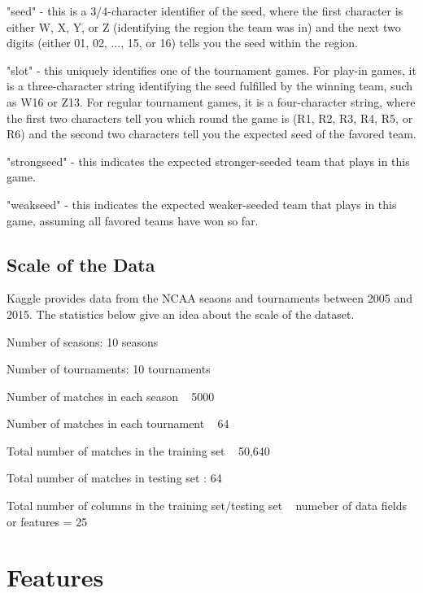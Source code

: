 \documentclass{article}
\begin{document}
\begin{multicols}{2}
\begin{list}{Field}{}
"seed" - this is a 3/4-character identifier of the seed, where the first character is either W, X, Y, or Z (identifying the region the team was in) and the next two digits (either 01, 02, ..., 15, or 16) tells you the seed within the region.
\item
"slot" - this uniquely identifies one of the tournament games. For play-in games, it is a three-character string identifying the seed fulfilled by the winning team, such as W16 or Z13. For regular tournament games, it is a four-character string, where the first two characters tell you which round the game is (R1, R2, R3, R4, R5, or R6) and the second two characters tell you the expected seed of the favored team.
\item
"strongseed" - this indicates the expected stronger-seeded team that plays in this game.
\item
"weakseed" - this indicates the expected weaker-seeded team that plays in this game, assuming all favored teams have won so far.
\end{list}

	\subsection{Scale of the Data}
	Kaggle provides data from the NCAA seaons and tournaments between 2005 and 2015. The statistics below give an idea about the scale of the dataset.	
\begin{list}{•}{•}
\item
Number of seasons: 10 seasons
\item
Number of tournaments: 10 tournaments
\item
Number of matches in each season ~ 5000
\item
Number of matches in each tournament ~ 64
\item
Total number of matches in the training set ~ 50,640
\item
Total number of matches in testing set : 64
\item
Total number of columns in the training set/testing set ~ numeber of data fields or features = 25
\end{list}

	\section{Features}
		 
	\end{multicols}  
\end{document}
